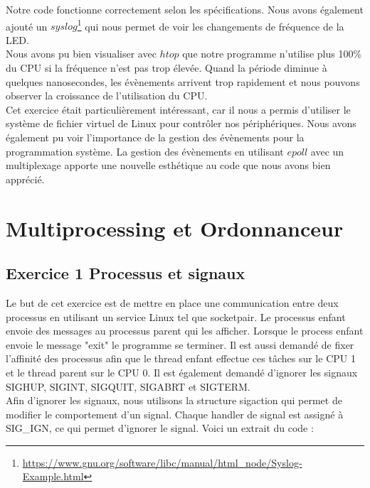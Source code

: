 \documentclass[
	a4paper, %
	10pt, %
]{CSUniSchoolLabReport}
\begin{document}
Notre code fonctionne correctement selon les spécifications. Nous avons également ajouté un $syslog$\footnote{\href{https://www.gnu.org/software/libc/manual/html_node/Syslog-Example.html}{https://www.gnu.org/software/libc/manual/html\_node/Syslog-Example.html}} qui nous permet de voir les changements de fréquence de la LED.\\
Nous avons pu bien visualiser avec $htop$ que notre programme n'utilise plus 100\% du CPU si la fréquence n'est pas trop élevée. Quand la période diminue à quelques nanosecondes, les évènements arrivent trop rapidement et nous pouvons observer la croissance de l'utilisation du CPU.\\
Cet exercice était particulièrement intéressant, car il nous a permis d'utiliser le système de fichier virtuel de Linux pour contrôler nos périphériques. Nous avons également pu voir l'importance de la gestion des évènements pour la programmation système. La gestion des évènements en utilisant $epoll$ avec un multiplexage apporte une nouvelle esthétique au code que nous avons bien apprécié.

\section{Multiprocessing et Ordonnanceur}\label{multiprocess}
\subsection{Exercice 1 Processus et signaux}\label{MPEx1}
Le but de cet exercice est de mettre en place une communication entre deux processus en utilisant un service Linux tel que socketpair.
Le processus enfant envoie des messages au processus parent qui les afficher. Lorsque le process enfant envoie le message "exit" le programme se terminer.
Il est aussi demand\'e de fixer l'affinité des processus afin que le thread enfant effectue ces t\^aches sur le CPU 1 et le thread parent sur le CPU 0.
Il est également demandé d'ignorer les signaux SIGHUP, SIGINT, SIGQUIT, SIGABRT et SIGTERM.\\

Afin d'ignorer les signaux, nous utilisons la structure sigaction qui permet de modifier le comportement d'un signal.
Chaque handler de signal est assigné à SIG\_IGN, ce qui permet d'ignorer le signal.
Voici un extrait du code :
\end{document}
